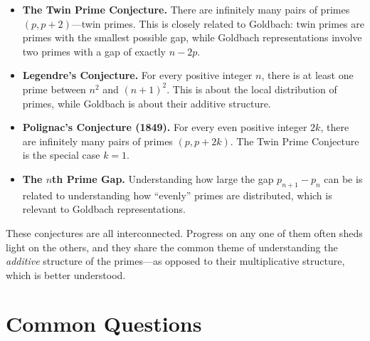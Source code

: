 \begin{itemize}
    \item \textbf{The Twin Prime Conjecture.} There are infinitely many pairs of primes $(p, p+2)$---twin primes. This is closely related to Goldbach: twin primes are primes with the smallest possible gap, while Goldbach representations involve two primes with a gap of exactly $n - 2p$.

    \item \textbf{Legendre's Conjecture.} For every positive integer $n$, there is at least one prime between $n^2$ and $(n+1)^2$. This is about the local distribution of primes, while Goldbach is about their additive structure.

    \item \textbf{Polignac's Conjecture (1849).} For every even positive integer $2k$, there are infinitely many pairs of primes $(p, p + 2k)$. The Twin Prime Conjecture is the special case $k = 1$.

    \item \textbf{The $n$th Prime Gap.} Understanding how large the gap $p_{n+1} - p_n$ can be is related to understanding how ``evenly'' primes are distributed, which is relevant to Goldbach representations.
\end{itemize}

These conjectures are all interconnected. Progress on any one of them often sheds light on the others, and they share the common theme of understanding the \emph{additive} structure of the primes---as opposed to their multiplicative structure, which is better understood.

\section*{Common Questions}

